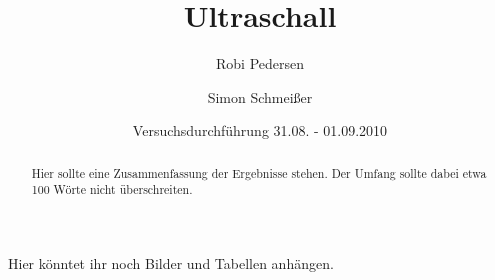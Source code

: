 \documentclass[a4paper,oneside]{scrartcl} %
\title{Ultraschall}
\author{Robi Pedersen \and Simon Schmeißer}
\date{Versuchsdurchführung 31.08. - 01.09.2010}
\begin{document}
\begin{titlepage}
  \maketitle
  \vfill
  \thispagestyle{empty}
  \begin{abstract}
    Hier sollte eine Zusammenfassung der Ergebnisse stehen. Der Umfang sollte dabei etwa 100 Wörte nicht überschreiten.
  \end{abstract}
\end{titlepage}

\tableofcontents
\clearpage









\clearpage
\appendix
Hier könntet ihr noch Bilder und Tabellen anhängen.
\clearpage


 

\end{document}
